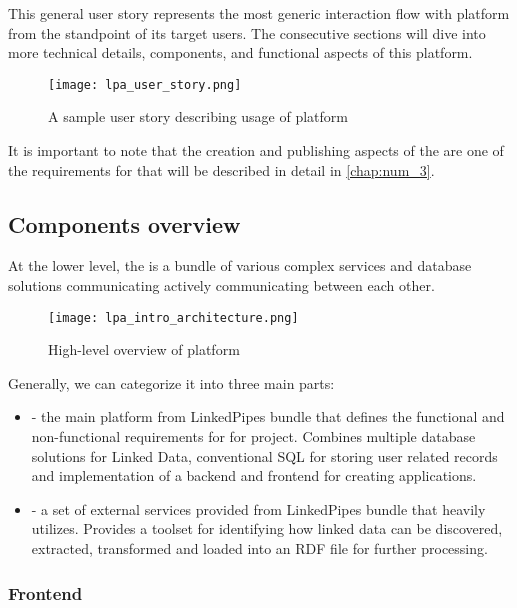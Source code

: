 This general user story represents the most generic interaction flow with \lpa{} platform from the standpoint of its target users. The consecutive sections will dive into more technical details, components, and functional aspects of this platform. 

\begin{figure}[h]
    \centering
    \texttt{[image: lpa\_user\_story.png]}
    \caption{A sample user story describing usage of \lpa{} platform}
    \label{fig:lpa_user_story}
\end{figure}

It is important to note that the creation and publishing aspects of the \lpa{} are one of the requirements for \lpas{} that will be described in detail in \autoref{chap:num_3}. 

\subsection{Components overview}
\label{sssec:lpa_preliminaries_component_overview}

At the lower level, the \lpa{} is a bundle of various complex services and database solutions communicating actively communicating between each other. 

\begin{figure}[h]
    \centering
    \texttt{[image: lpa\_intro\_architecture.png]}
    \caption{High-level overview of \lpa{} platform}
    \label{fig:lpa_intro_architecture}
\end{figure}

Generally, we can categorize it into three main parts: 

\begin{itemize}
    \item \textbf{\fulllpa{}} - the main platform from LinkedPipes bundle that defines the functional and non-functional requirements for for \lpas{} project. Combines multiple database solutions for Linked Data, conventional SQL for storing user related records and implementation of a backend and frontend for creating applications.
    \item \textbf{\lps{}} - a set of external services provided from LinkedPipes bundle that \lpa{} heavily utilizes. Provides a toolset for identifying how linked data can be discovered, extracted, transformed and loaded into an RDF file for further processing.
\end{itemize}

\subsubsection{Frontend}

